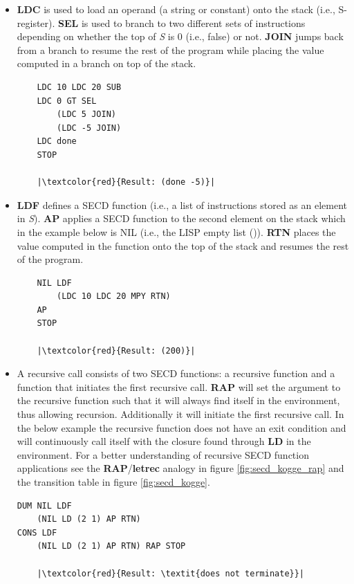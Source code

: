 \documentclass[a4paper,12pt,twoside,openright]{report}
\theoremstyle{definition}
\newcommand{\ts}{\textquotesingle}
\begin{document}
\begin{itemize}
    \item \textbf{LDC} is used to load an operand (a string or constant) onto the stack (i.e., S-register). \textbf{SEL} is used to branch to two different sets of instructions depending on whether the top of \textit{S} is 0 (i.e., false) or not. \textbf{JOIN} jumps back from a branch to resume the rest of the program while placing the value computed in a branch on top of the stack.
\begin{verbatim}
    LDC 10 LDC 20 SUB
    LDC 0 GT SEL
        (LDC 5 JOIN)
        (LDC -5 JOIN)
    LDC done
    STOP
    
    |\textcolor{red}{Result: (done -5)}|
\end{verbatim}
    \item \textbf{LDF} defines a SECD function (i.e., a list of instructions stored as an element in \textit{S}). \textbf{AP} applies a SECD function to the second element on the stack which in the example below is NIL (i.e., the LISP empty list {\ts}()). \textbf{RTN} places the value computed in the function onto the top of the stack and resumes the rest of the program.
\begin{verbatim}
    NIL LDF
        (LDC 10 LDC 20 MPY RTN)
    AP
    STOP

    |\textcolor{red}{Result: (200)}|
\end{verbatim}

    \item A recursive call consists of two SECD functions: a recursive function and a function that initiates the first recursive call. \textbf{RAP} will set the argument to the recursive function such that it will always find itself in the environment, thus allowing recursion. Additionally it will initiate the first recursive call. In the below example the recursive function does not have an exit condition and will continuously call itself with the closure found through \textbf{LD} in the environment. For a better understanding of recursive SECD function applications see the \textbf{RAP}/\textbf{letrec} analogy in figure \ref{fig:secd_kogge_rap} and the transition table in figure \ref{fig:secd_kogge}.
\begin{verbatim}
DUM NIL LDF
    (NIL LD (2 1) AP RTN)
CONS LDF
    (NIL LD (2 1) AP RTN) RAP STOP

    |\textcolor{red}{Result: \textit{does not terminate}}|
\end{verbatim}
\end{itemize}
\end{document}
